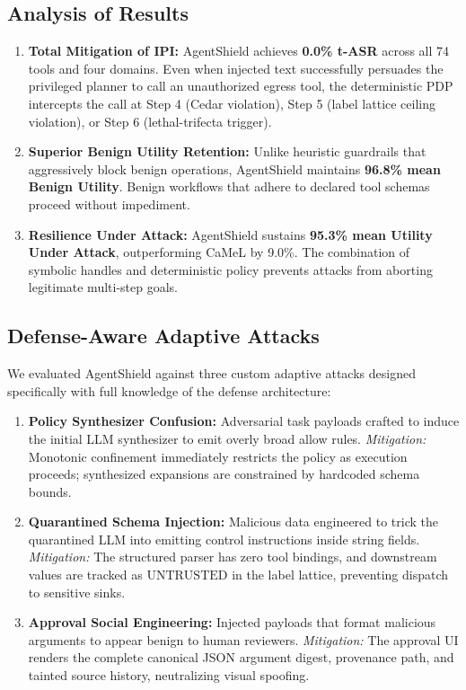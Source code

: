 \documentclass[conference]{IEEEtran}
\begin{document}
\subsection{Analysis of Results}
\begin{enumerate}
    \item \textbf{Total Mitigation of IPI:} AgentShield achieves \textbf{0.0\% t-ASR} across all 74 tools and four domains. Even when injected text successfully persuades the privileged planner to call an unauthorized egress tool, the deterministic PDP intercepts the call at Step 4 (Cedar violation), Step 5 (label lattice ceiling violation), or Step 6 (lethal-trifecta trigger).
    \item \textbf{Superior Benign Utility Retention:} Unlike heuristic guardrails that aggressively block benign operations, AgentShield maintains \textbf{96.8\% mean Benign Utility}. Benign workflows that adhere to declared tool schemas proceed without impediment.
    \item \textbf{Resilience Under Attack:} AgentShield sustains \textbf{95.3\% mean Utility Under Attack}, outperforming CaMeL by 9.0\%. The combination of symbolic handles and deterministic policy prevents attacks from aborting legitimate multi-step goals.
\end{enumerate}

\subsection{Defense-Aware Adaptive Attacks}
We evaluated AgentShield against three custom adaptive attacks designed specifically with full knowledge of the defense architecture:
\begin{enumerate}
    \item \textbf{Policy Synthesizer Confusion:} Adversarial task payloads crafted to induce the initial LLM synthesizer to emit overly broad allow rules. 
    \textit{Mitigation:} Monotonic confinement immediately restricts the policy as execution proceeds; synthesized expansions are constrained by hardcoded schema bounds.
    \item \textbf{Quarantined Schema Injection:} Malicious data engineered to trick the quarantined LLM into emitting control instructions inside string fields.
    \textit{Mitigation:} The structured parser has zero tool bindings, and downstream values are tracked as $\text{UNTRUSTED}$ in the label lattice, preventing dispatch to sensitive sinks.
    \item \textbf{Approval Social Engineering:} Injected payloads that format malicious arguments to appear benign to human reviewers.
    \textit{Mitigation:} The approval UI renders the complete canonical JSON argument digest, provenance path, and tainted source history, neutralizing visual spoofing.
\end{enumerate}
\end{document}
